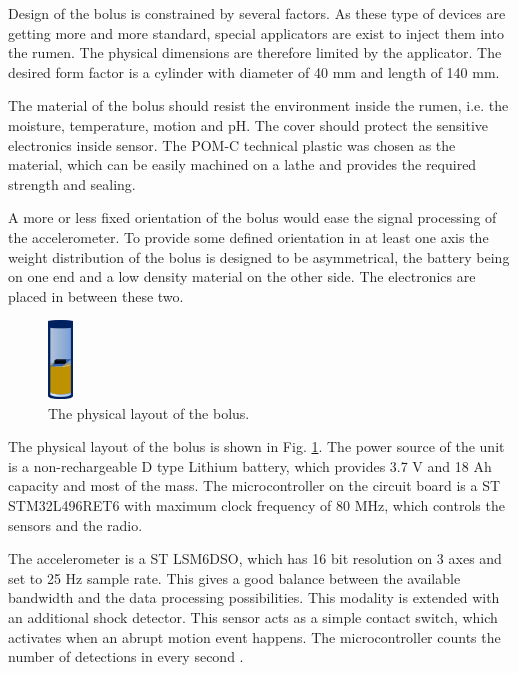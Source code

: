 \documentclass[conference]{IEEEtran}
\begin{document}
Design of the bolus is constrained by several factors. As these type
of devices are getting more and more standard, special applicators are
exist to inject them into the rumen. The physical dimensions are therefore
limited by the applicator. The desired form factor is a cylinder with
diameter of 40 mm and length of 140 mm.

The material of the bolus should resist the environment inside the rumen,
i.e. the moisture, temperature, motion and pH. The cover should protect
the sensitive electronics inside sensor. The POM-C technical plastic was
chosen as the material, which can be easily machined on a lathe and provides
the required strength and sealing.

A more or less fixed orientation of the bolus would ease the signal
processing of the accelerometer. To provide some defined orientation
in at least one axis the weight distribution of the bolus is designed
to be asymmetrical, the battery being on one end and a low density
material on the other side. The electronics are placed in between these two.

\begin{figure}[htbp]
  \centerline{\includegraphics[width=0.06\textwidth]{fig/bolus-physical-layout.png}}
  \caption{The physical layout of the bolus.}
  \label{bolus-physical-layout}
\end{figure}

The physical layout of the bolus is shown in Fig. \ref{bolus-physical-layout}.
The power source of the unit is a non-rechargeable D type Lithium battery,
which provides 3.7 V and 18 Ah capacity and most of the mass. The
microcontroller on the circuit board is a ST STM32L496RET6 with maximum
clock frequency of 80 MHz, which controls the
sensors and the radio.

The accelerometer is a ST LSM6DSO, which has 16 bit resolution on 3 axes and
set to 25 Hz sample rate. This gives a good balance between the available
bandwidth and the data processing possibilities. This modality is extended
with an additional shock detector. This sensor acts as a simple contact switch,
which activates when an abrupt motion event happens. The microcontroller
counts the number of detections in every second  \cite{karmenova2022approach, MTMT:31600238}.
\end{document}
